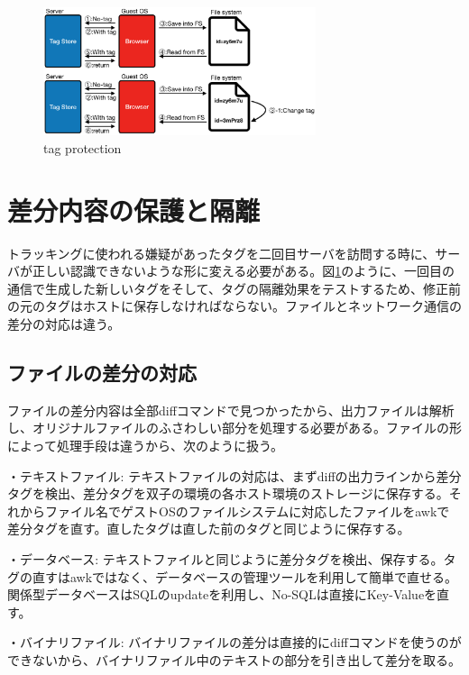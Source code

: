 \documentclass[a4paper,twocolumn,10pt]{jarticle}
\begin{document}
\begin{figure}[ht]
\begin{center}
\includegraphics[width=8cm]{img/tag.eps}
\caption{tag protection}
\label{figure:tag}
\end{center}
\end{figure}


\section{差分内容の保護と隔離}

トラッキングに使われる嫌疑があったタグを二回目サーバを訪問する時に、サーバが正しい認識できないような形に変える必要がある。図\ref{figure:tag}のように、一回目の通信で生成した新しいタグをそして、タグの隔離効果をテストするため、修正前の元のタグはホストに保存しなければならない。ファイルとネットワーク通信の差分の対応は違う。

\subsection{ファイルの差分の対応}
ファイルの差分内容は全部diffコマンドで見つかったから、出力ファイルは解析し、オリジナルファイルのふさわしい部分を処理する必要がある。ファイルの形によって処理手段は違うから、次のように扱う。

\begin{description}
\item{・テキストファイル: }
テキストファイルの対応は、まずdiffの出力ラインから差分タグを検出、差分タグを双子の環境の各ホスト環境のストレージに保存する。それからファイル名でゲストOSのファイルシステムに対応したファイルをawkで差分タグを直す。直したタグは直した前のタグと同じように保存する。
\item{・データベース: }
テキストファイルと同じように差分タグを検出、保存する。タグの直すはawkではなく、データベースの管理ツールを利用して簡単で直せる。関係型データベースはSQLのupdateを利用し、No-SQLは直接にKey-Valueを直す。
\item{・バイナリファイル: }
バイナリファイルの差分は直接的にdiffコマンドを使うのができないから、バイナリファイル中のテキストの部分を引き出して差分を取る。
\end{description}
\end{document}
